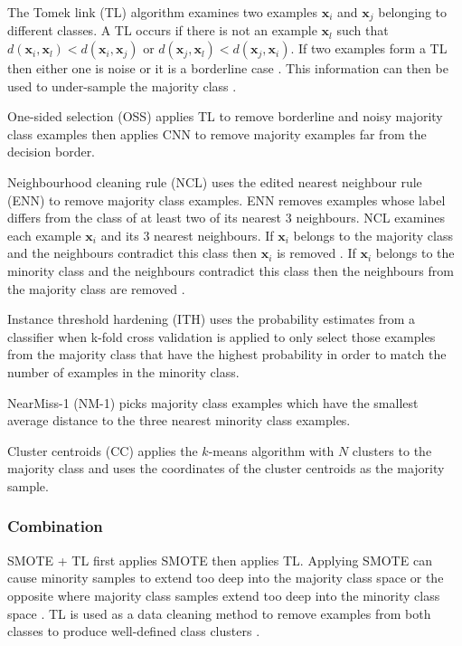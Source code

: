 \documentclass{sig-alternate-05-2015}
\begin{document}
	The Tomek link (TL) algorithm \cite{4309452} examines two examples $\textbf{x}_i$ and $\textbf{x}_j$ belonging to different classes. A TL occurs if there is not an example $\textbf{x}_l$ such that $d(\textbf{x}_i, \textbf{x}_l) < d(\textbf{x}_i, \textbf{x}_j)$ or $d(\textbf{x}_j, \textbf{x}_l) < d(\textbf{x}_j, \textbf{x}_i)$. If two examples form a TL then either one is noise or it is a borderline case \cite{Batista:2004:SBS:1007730.1007735}. This information can then be used to under-sample the majority class \cite{Batista:2004:SBS:1007730.1007735}.
	
	One-sided selection (OSS) \cite{Kubat97addressingthe} applies TL to remove borderline and noisy majority class examples then applies CNN to remove majority examples far from the decision border.
	
	Neighbourhood cleaning rule (NCL) \cite{Laurikkala:2001:IID:648155.757340} uses the edited nearest neighbour rule (ENN) to remove majority class examples. ENN removes examples whose label differs from the class of at least two of its nearest 3 neighbours. NCL examines each example $\textbf{x}_i$ and its 3 nearest neighbours. If $\textbf{x}_i$ belongs to the majority class and the neighbours contradict this class then $\textbf{x}_i$ is removed \cite{Batista:2004:SBS:1007730.1007735}. If $\textbf{x}_i$ belongs to the minority class and the neighbours contradict this class then the neighbours from the majority class are removed \cite{Batista:2004:SBS:1007730.1007735}.
	
	Instance threshold hardening (ITH) \cite{Smith:2014:ILA:2843614.2843686} uses the probability estimates from a classifier when k-fold cross validation is applied to only select those examples from the majority class that have the highest probability in order to match the number of examples in the minority class.
	
	NearMiss-1 (NM-1) \cite{mani2003knn} picks majority class examples which have the smallest average distance to the three nearest minority class examples.
	
	Cluster centroids (CC) applies the $k$-means algorithm with $N$ clusters to the majority class and uses the coordinates of the cluster centroids as the majority sample.	
	
	\subsubsection{Combination}
	SMOTE + TL \cite{batista2003balancing} first applies SMOTE then applies TL. Applying SMOTE can cause minority samples to extend too deep into the majority class space or the opposite where majority class samples extend too deep into the minority class space \cite{batista2003balancing}. TL is used as a data cleaning method to remove examples from both classes to produce well-defined class clusters \cite{batista2003balancing}.
	
\end{document}
